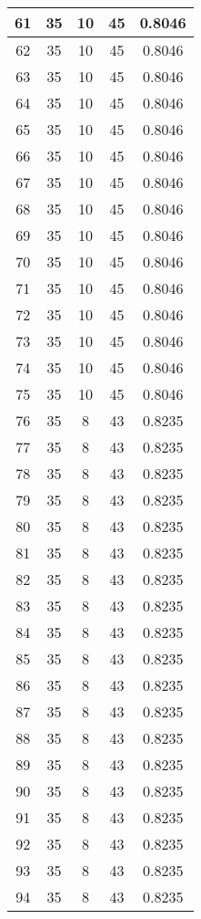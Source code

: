 \documentclass[letterpaper, 12pt]{article}
\begin{document}
\begin{longtable}{|c|c|c|c|c|}
\hline
61 & 35 & 10 & 45 & 0.8046 \\
\hline
62 & 35 & 10 & 45 & 0.8046 \\
\hline
63 & 35 & 10 & 45 & 0.8046 \\
\hline
64 & 35 & 10 & 45 & 0.8046 \\
\hline
65 & 35 & 10 & 45 & 0.8046 \\
\hline
66 & 35 & 10 & 45 & 0.8046 \\
\hline
67 & 35 & 10 & 45 & 0.8046 \\
\hline
68 & 35 & 10 & 45 & 0.8046 \\
\hline
69 & 35 & 10 & 45 & 0.8046 \\
\hline
70 & 35 & 10 & 45 & 0.8046 \\
\hline
71 & 35 & 10 & 45 & 0.8046 \\
\hline
72 & 35 & 10 & 45 & 0.8046 \\
\hline
73 & 35 & 10 & 45 & 0.8046 \\
\hline
74 & 35 & 10 & 45 & 0.8046 \\
\hline
75 & 35 & 10 & 45 & 0.8046 \\
\hline
76 & 35 & 8 & 43 & 0.8235 \\
\hline
77 & 35 & 8 & 43 & 0.8235 \\
\hline
78 & 35 & 8 & 43 & 0.8235 \\
\hline
79 & 35 & 8 & 43 & 0.8235 \\
\hline
80 & 35 & 8 & 43 & 0.8235 \\
\hline
81 & 35 & 8 & 43 & 0.8235 \\
\hline
82 & 35 & 8 & 43 & 0.8235 \\
\hline
83 & 35 & 8 & 43 & 0.8235 \\
\hline
84 & 35 & 8 & 43 & 0.8235 \\
\hline
85 & 35 & 8 & 43 & 0.8235 \\
\hline
86 & 35 & 8 & 43 & 0.8235 \\
\hline
87 & 35 & 8 & 43 & 0.8235 \\
\hline
88 & 35 & 8 & 43 & 0.8235 \\
\hline
89 & 35 & 8 & 43 & 0.8235 \\
\hline
90 & 35 & 8 & 43 & 0.8235 \\
\hline
91 & 35 & 8 & 43 & 0.8235 \\
\hline
92 & 35 & 8 & 43 & 0.8235 \\
\hline
93 & 35 & 8 & 43 & 0.8235 \\
\hline
94 & 35 & 8 & 43 & 0.8235 \\
\hline

\end{longtable}
\end{document}
